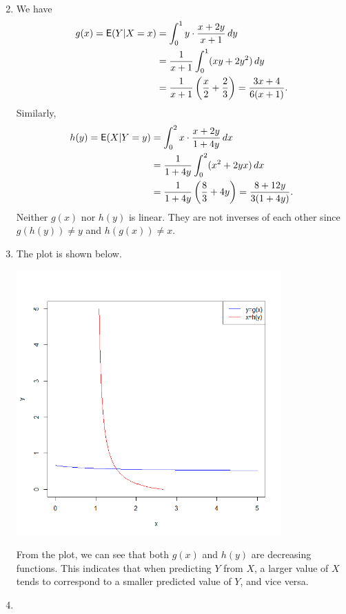\documentclass[12pt]{article}
\newcommand{\E}{{\sf E}}
\newenvironment{problem}[2][Problem]{\begin{trivlist}
\item[\hskip \labelsep {\bfseries #1}\hskip \labelsep {\bfseries #2.}]}
{\end{trivlist}}
\begin{document}
\begin{problem}{5}
\begin{enumerate}
\begin{align*}
    \end{align*}
    \item We have
    \begin{align*}
      g(x) = \E(Y|X = x) &= \int_0^1 y \cdot \frac{x + 2y}{x + 1} \, dy \\
      &= \frac{1}{x + 1} \int_0^1 (xy + 2y^2) \, dy \\
      &= \frac{1}{x + 1} \left(\frac{x}{2} + \frac{2}{3}\right) 
      = \frac{3x + 4}{6(x + 1)}.
    \end{align*}
    Similarly,
    \begin{align*}
      h(y) = \E(X|Y = y) &= \int_0^2 x \cdot \frac{x + 2y}{1 + 4y} \, dx \\
      &= \frac{1}{1 + 4y} \int_0^2 (x^2 + 2yx) \, dx \\
      &= \frac{1}{1 + 4y} \left(\frac{8}{3} + 4y\right) 
      = \frac{8 + 12y}{3(1 + 4y)}.
    \end{align*}
    Neither $g(x)$ nor $h(y)$ is linear. They are not inverses of each other
    since $g(h(y)) \neq y$ and $h(g(x)) \neq x$.
    \item The plot is shown below.
    \begin{center}
      \includegraphics[width=0.8\textwidth]{5c.png}
    \end{center}
    From the plot, we can see that both $g(x)$ and $h(y)$ are decreasing
    functions. This indicates that when predicting $Y$ from $X$, a larger
    value of $X$ tends to correspond to a smaller predicted value of $Y$,
    and vice versa.
    \item

\end{enumerate}
\end{problem}
\end{document}
